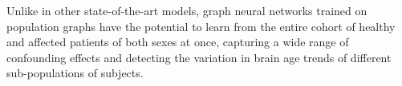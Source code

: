 Unlike in other state-of-the-art models, graph neural networks trained on population graphs have the potential to learn from the entire cohort of healthy and affected patients of both sexes at once, capturing a wide range of confounding effects and detecting the variation in brain age trends of different sub-populations of subjects. 







